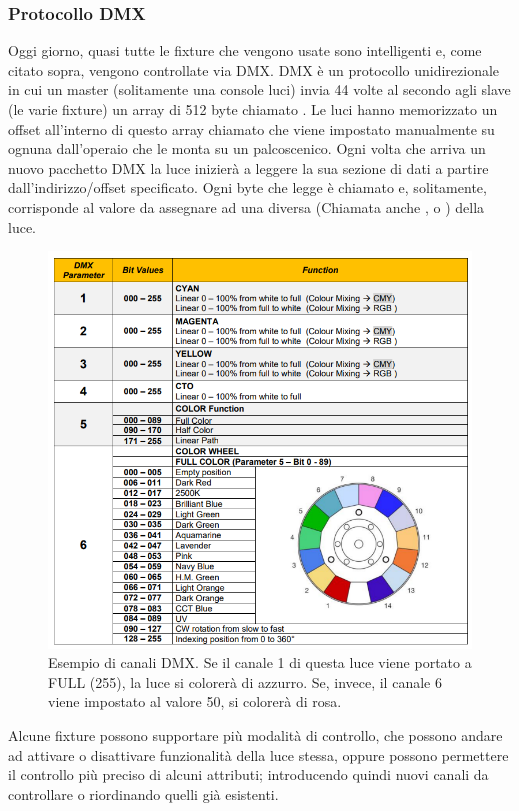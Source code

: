 \documentclass[main.tex]{subfiles}
\begin{document}
\subsubsection{Protocollo DMX}\label{subsec:1_1_dmx}
Oggi giorno, quasi tutte le fixture che vengono usate sono intelligenti e, come citato sopra, vengono controllate via DMX. DMX è un protocollo unidirezionale in cui un master (solitamente una console luci) invia 44 volte al secondo agli slave (le varie fixture) un array di 512 byte chiamato . Le luci hanno memorizzato un offset all'interno di questo array chiamato  che viene impostato manualmente su ognuna dall'operaio che le monta su un palcoscenico. Ogni volta che arriva un nuovo pacchetto DMX la luce inizierà a leggere la sua sezione di dati a partire dall'indirizzo/offset specificato. Ogni byte che legge è chiamato  e, solitamente, corrisponde al valore da assegnare ad una diversa  (Chiamata anche , o ) della luce.
\begin{figure}[H]
    \centering
    \includegraphics[width=0.65\linewidth]{img/introduzione/dmxChannelDescExample.png}
    \caption{Esempio di canali DMX. Se il canale 1 di questa luce viene portato a FULL (255), la luce si colorerà di azzurro. Se, invece, il canale 6 viene impostato al valore 50, si colorerà di rosa.}
    \label{fig:1_dmxChannelsExample}
\end{figure}

Alcune fixture possono supportare più modalità di controllo, che possono andare ad attivare o disattivare funzionalità della luce stessa, oppure possono permettere il controllo più preciso di alcuni attributi; introducendo quindi nuovi canali da controllare o riordinando quelli già esistenti. 
\end{document}
